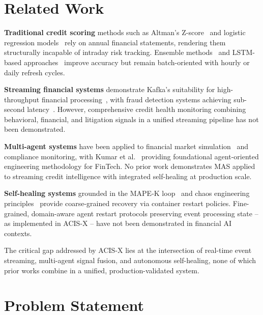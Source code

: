 \documentclass[runningheads]{llncs}
\begin{document}
\section{Related Work}
\label{sec:related}

\textbf{Traditional credit scoring} methods such as Altman's Z-score~\cite{altman1968financial} and logistic regression models~\cite{wang2024explainable} rely on annual financial statements, rendering them structurally incapable of intraday risk tracking. Ensemble methods~\cite{li2024ensemble} and LSTM-based approaches~\cite{chen2025streaming} improve accuracy but remain batch-oriented with hourly or daily refresh cycles.

\textbf{Streaming financial systems} demonstrate Kafka's suitability for high-throughput financial processing~\cite{kreps2011kafka}, with fraud detection systems achieving sub-second latency~\cite{liu2025realtime}. However, comprehensive credit health monitoring combining behavioral, financial, and litigation signals in a unified streaming pipeline has not been demonstrated.

\textbf{Multi-agent systems} have been applied to financial market simulation~\cite{zhao2024multiagent} and compliance monitoring, with Kumar et al.~\cite{kumar2024engineering} providing foundational agent-oriented engineering methodology for FinTech. No prior work demonstrates MAS applied to streaming credit intelligence with integrated self-healing at production scale.

\textbf{Self-healing systems} grounded in the MAPE-K loop~\cite{singh2025selfhealing} and chaos engineering principles~\cite{patel2024chaos} provide coarse-grained recovery via container restart policies. Fine-grained, domain-aware agent restart protocols preserving event processing state -- as implemented in ACIS-X -- have not been demonstrated in financial AI contexts.

The critical gap addressed by ACIS-X lies at the intersection of real-time event streaming, multi-agent signal fusion, and autonomous self-healing, none of which prior works combine in a unified, production-validated system.

\section{Problem Statement}
\label{sec:problem}
\end{document}
